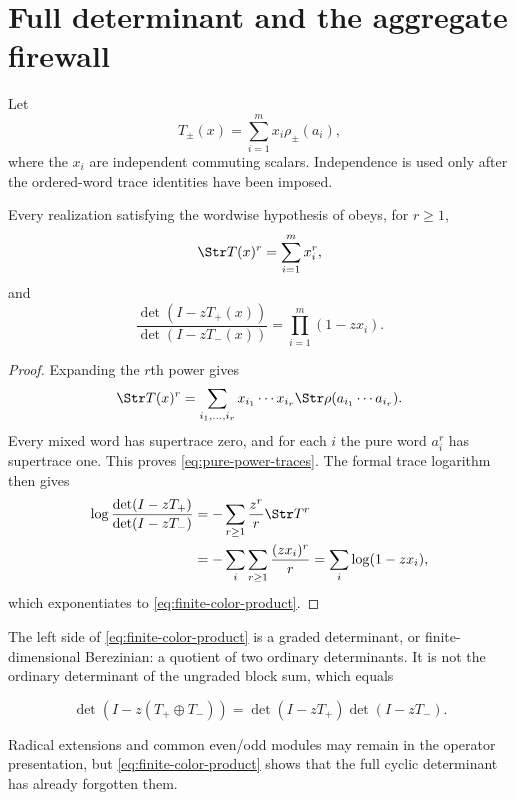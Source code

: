 \section{Full determinant and the aggregate firewall}
\label{sec:determinant}

Let
\begin{equation}
 T_\pm(x)=\sum_{i=1}^m x_i\rho_\pm(a_i),
 \label{eq:weighted-color-pencil}
\end{equation}
where the \(x_i\) are independent commuting scalars.  Independence is used
only after the ordered-word trace identities have been imposed.

\begin{theorem}
\label{thm:determinant-collapse}
Every realization satisfying the wordwise hypothesis of
 obeys, for \(r\ge1\),
\begin{equation}
 \Str T(x)^r=\sum_{i=1}^m x_i^r,
 \label{eq:pure-power-traces}
\end{equation}
and
\begin{equation}
 \frac{\det(I-zT_+(x))}{\det(I-zT_-(x))}
 =\prod_{i=1}^m(1-zx_i).
 \label{eq:finite-color-product}
\end{equation}
\end{theorem}

\begin{proof}
Expanding the \(r\)th power gives
\[
 \Str T(x)^r
 =\sum_{i_1,\ldots,i_r}x_{i_1}\cdots x_{i_r}
   \Str\rho(a_{i_1}\cdots a_{i_r}).
\]
Every mixed word has supertrace zero, and for each \(i\) the pure word
\(a_i^r\) has supertrace one.  This proves
\eqref{eq:pure-power-traces}.  The formal trace logarithm then gives
\[
 \begin{aligned}
 \log\frac{\det(I-zT_+)}{\det(I-zT_-)}
 &=-\sum_{r\ge1}\frac{z^r}{r}\Str T^r\\
 &=-\sum_i\sum_{r\ge1}\frac{(zx_i)^r}{r}
 =\sum_i\log(1-zx_i),
 \end{aligned}
\]
which exponentiates to \eqref{eq:finite-color-product}.
\end{proof}

The left side of \eqref{eq:finite-color-product} is a graded determinant, or
finite-dimensional Berezinian: a quotient of two ordinary determinants.  It
is not the ordinary determinant of the ungraded block sum, which equals

\[
 \det(I-z(T_+\oplus T_-))=\det(I-zT_+)\det(I-zT_-).
\]

Radical extensions and common even/odd modules may remain in the operator
presentation, but \eqref{eq:finite-color-product} shows that the full cyclic
determinant has already forgotten them.


